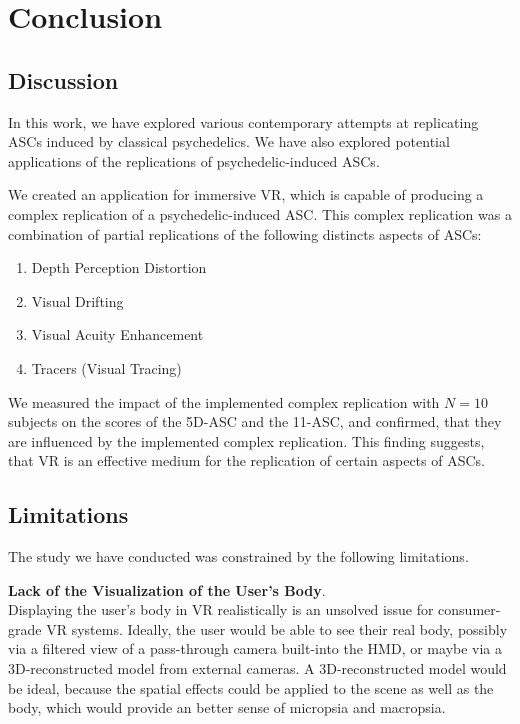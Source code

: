 \chapter{Conclusion}
\section{Discussion}
In this work, we have explored various contemporary attempts at replicating \acfp{ASC} induced by classical psychedelics. We have also explored potential applications of the replications of psychedelic-induced \acp{ASC}.

We created an application for immersive \acf{VR}, which is capable of producing a complex replication of a psychedelic-induced \ac{ASC}. This complex replication was a combination of partial replications of the following distincts aspects of \acp{ASC}:

\begin{enumerate}
    \setlength{\itemsep}{0pt}
    \setlength{\parskip}{0pt}
    \item Depth Perception Distortion
    \item Visual Drifting
    \item Visual Acuity Enhancement
    \item Tracers (Visual Tracing)
\end{enumerate}

We measured the impact of the implemented complex replication with $N=10$ subjects on the scores of the \acf{5D-ASC} and the \acf{11-ASC}, and confirmed, that they are influenced by the implemented complex replication. This finding suggests, that \ac{VR} is an effective medium for the replication of certain aspects of \acp{ASC}.

\section{Limitations}
The study we have conducted was constrained by the following limitations.

\textbf{Lack of the Visualization of the User's Body}.\\
Displaying the user's body in \ac{VR} realistically is an unsolved issue for consumer-grade \ac{VR} systems. Ideally, the user would be able to see their real body, possibly via a filtered view of a pass-through camera built-into the \acf{HMD}, or maybe via a 3D-reconstructed model from external cameras. A 3D-reconstructed model would be ideal, because the spatial effects could be applied to the scene as well as the body, which would provide an better sense of micropsia and macropsia.

